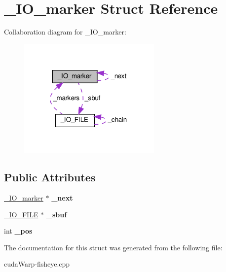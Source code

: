\hypertarget{struct__IO__marker}{}\section{\+\_\+\+I\+O\+\_\+marker Struct Reference}
\label{struct__IO__marker}


Collaboration diagram for \+\_\+\+I\+O\+\_\+marker\+:\nopagebreak
\begin{figure}[H]
\begin{center}
\leavevmode
\includegraphics[width=198pt]{struct__IO__marker__coll__graph}
\end{center}
\end{figure}
\subsection*{Public Attributes}
\begin{DoxyCompactItemize}
\item 
\hyperlink{struct__IO__marker}{\+\_\+\+I\+O\+\_\+marker} $\ast$ {\bfseries \+\_\+next}\hypertarget{struct__IO__marker_afd2a5b2836f3f473c1adcfe33b77b3d7}{}\label{struct__IO__marker_afd2a5b2836f3f473c1adcfe33b77b3d7}

\item 
\hyperlink{struct__IO__FILE}{\+\_\+\+I\+O\+\_\+\+F\+I\+LE} $\ast$ {\bfseries \+\_\+sbuf}\hypertarget{struct__IO__marker_a591af1aff80322d9f042639f2d3d7aef}{}\label{struct__IO__marker_a591af1aff80322d9f042639f2d3d7aef}

\item 
int {\bfseries \+\_\+pos}\hypertarget{struct__IO__marker_a3f83a64703190d685175dc43b9e122a6}{}\label{struct__IO__marker_a3f83a64703190d685175dc43b9e122a6}

\end{DoxyCompactItemize}


The documentation for this struct was generated from the following file\+:\begin{DoxyCompactItemize}
\item 
cuda\+Warp-\/fisheye.\+cpp\end{DoxyCompactItemize}
